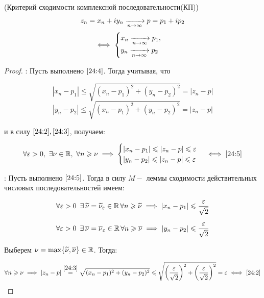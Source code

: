 \documentclass[../../main.tex]{subfiles}
\begin{document}
\begin{thm}(Критерий сходимости комплексной последовательности(КП))
	\begin{equation}\label{24:4}
		z_n = x_n + i y_n \xrightarrow[n \rightarrow \infty]{} p = p_1 + i p_2
	\end{equation}
	\begin{equation}\label{24:5}
		\iff
		\begin{cases}
			x_n \xrightarrow[n \rightarrow \infty]{} p_1, \\
			y_n \xrightarrow[n \rightarrow \infty]{} p_2
		\end{cases}\,
	\end{equation}
\end{thm}
\begin{proof}
\;

	\nec: Пусть выполнено $ \eqref{24:4} $. Тогда учитывая, что
	
	\[|x_n - p_1| \leq \sqrt{(x_n - p_1)^2 + (y_n - p_2)^2} = |z_n - p|\]
	\[|y_n - p_2| \leq \sqrt{(x_n - p_1)^2 + (y_n - p_2)^2} = |z_n - p|\]
	
	и в силу $ \eqref{24:2}, \eqref{24:3} $, получаем:
	
	\[\forall \varepsilon > 0,\ \exists \nu \in \mathbb{R},\ \forall n \geqslant \nu \implies 
	\begin{cases}
		|x_n - p_1| \leqslant |z_n - p| \leqslant \varepsilon \\
		|y_n - p_2| \leqslant |z_n - p| \leqslant \varepsilon \\
	\end{cases} \iff \eqref{24:5} \]
	
	\suff: Пусть выполнено $ \eqref{24:5} $. Тогда в силу $ M- $ леммы сходимости 
	действительных числовых последовательностей имеем:
	
	\[\forall \varepsilon > 0\,\ \exists\, \widetilde{\nu} = \widetilde{\nu}_\varepsilon \in 
	\mathbb{R}\, \forall n \geqslant \widetilde{\nu} \implies 
	|x_n - p_1| \leqslant \frac{\varepsilon}{\sqrt{2}}\]
	
	\[\forall \varepsilon > 0\,\ \exists\, \overline{\nu} = \overline{\nu}_\varepsilon \in \mathbb{R}\, 
	\forall n \geqslant \overline{\nu} \implies 
	|y_n - p_2| \leqslant \frac{\varepsilon}{\sqrt{2}} \]
	
	Выберем $ \nu = \max\{\widetilde{\nu}, \overline{\nu}\} \in \mathbb{R} $. Тогда:
	
	\[\forall n \geqslant \nu \implies 
	|z_n - p| \stackrel{\eqref{24:3}}{=} \sqrt{(x_n - p_1)^2 + (y_n - p_2)^2} 
	\leqslant \sqrt{\left(\frac{\varepsilon}{\sqrt{2}}\right)^2 + 
	\left(\frac{\varepsilon}{\sqrt{2}}\right)^2} = \varepsilon \iff \eqref{24:2} \]
\end{proof}
\end{document}
